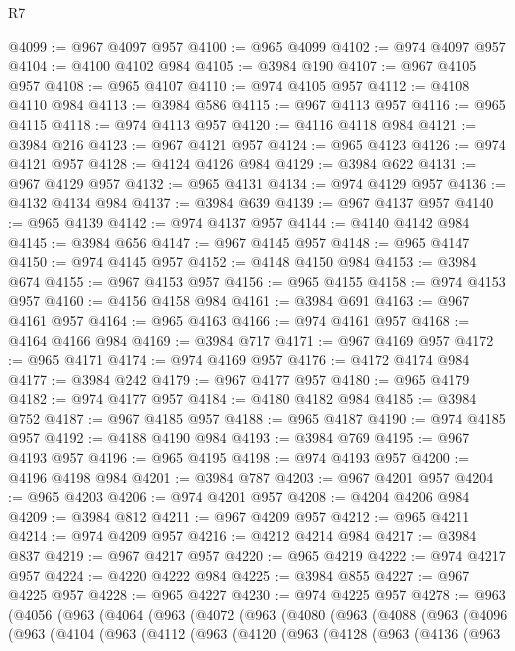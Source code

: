\begin{lexlean}{R7}
\begin{coremodule}
@4099 := @967 @4097 @957
@4100 := @965 @4099
@4102 := @974 @4097 @957
@4104 := @4100 @4102 @984
@4105 := @3984 @190
@4107 := @967 @4105 @957
@4108 := @965 @4107
@4110 := @974 @4105 @957
@4112 := @4108 @4110 @984
@4113 := @3984 @586
@4115 := @967 @4113 @957
@4116 := @965 @4115
@4118 := @974 @4113 @957
@4120 := @4116 @4118 @984
@4121 := @3984 @216
@4123 := @967 @4121 @957
@4124 := @965 @4123
@4126 := @974 @4121 @957
@4128 := @4124 @4126 @984
@4129 := @3984 @622
@4131 := @967 @4129 @957
@4132 := @965 @4131
@4134 := @974 @4129 @957
@4136 := @4132 @4134 @984
@4137 := @3984 @639
@4139 := @967 @4137 @957
@4140 := @965 @4139
@4142 := @974 @4137 @957
@4144 := @4140 @4142 @984
@4145 := @3984 @656
@4147 := @967 @4145 @957
@4148 := @965 @4147
@4150 := @974 @4145 @957
@4152 := @4148 @4150 @984
@4153 := @3984 @674
@4155 := @967 @4153 @957
@4156 := @965 @4155
@4158 := @974 @4153 @957
@4160 := @4156 @4158 @984
@4161 := @3984 @691
@4163 := @967 @4161 @957
@4164 := @965 @4163
@4166 := @974 @4161 @957
@4168 := @4164 @4166 @984
@4169 := @3984 @717
@4171 := @967 @4169 @957
@4172 := @965 @4171
@4174 := @974 @4169 @957
@4176 := @4172 @4174 @984
@4177 := @3984 @242
@4179 := @967 @4177 @957
@4180 := @965 @4179
@4182 := @974 @4177 @957
@4184 := @4180 @4182 @984
@4185 := @3984 @752
@4187 := @967 @4185 @957
@4188 := @965 @4187
@4190 := @974 @4185 @957
@4192 := @4188 @4190 @984
@4193 := @3984 @769
@4195 := @967 @4193 @957
@4196 := @965 @4195
@4198 := @974 @4193 @957
@4200 := @4196 @4198 @984
@4201 := @3984 @787
@4203 := @967 @4201 @957
@4204 := @965 @4203
@4206 := @974 @4201 @957
@4208 := @4204 @4206 @984
@4209 := @3984 @812
@4211 := @967 @4209 @957
@4212 := @965 @4211
@4214 := @974 @4209 @957
@4216 := @4212 @4214 @984
@4217 := @3984 @837
@4219 := @967 @4217 @957
@4220 := @965 @4219
@4222 := @974 @4217 @957
@4224 := @4220 @4222 @984
@4225 := @3984 @855
@4227 := @967 @4225 @957
@4228 := @965 @4227
@4230 := @974 @4225 @957
@4278 := @963
    (@4056
      (@963
        (@4064
          (@963
            (@4072
              (@963
                (@4080
                  (@963
                    (@4088
                      (@963
                        (@4096
                          (@963
                            (@4104
                              (@963
                                (@4112
                                  (@963
                                    (@4120
                                      (@963
                                        (@4128
                                          (@963
                                            (@4136
                                              (@963

\end{coremodule}
\end{lexlean}
